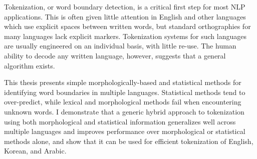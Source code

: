 Tokenization, or word boundary detection, is a critical first step for most NLP applications. This is often given little attention in English and other languages which use explicit spaces between written words, but standard orthographies for many languages lack explicit markers. Tokenization systems for such languages are usually engineered on an individual basis, with little re-use. The human ability to decode any written language, however, suggests that a general algorithm exists.

This thesis presents simple morphologically-based and statistical methods for identifying word boundaries in multiple languages. Statistical methods tend to over-predict, while lexical and morphological methods fail when encountering unknown words. I demonstrate that a generic hybrid approach to tokenization using both morphological and statistical information generalizes well across multiple languages and improves performance over morphological or statistical methods alone, and show that it can be used for efficient tokenization of English, Korean, and Arabic.